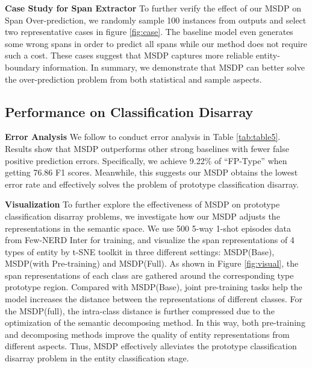 \documentclass[sigconf,natbib=true,anonymous=False]{acmart}
\begin{document}
\textbf{Case Study for Span Extractor} To further verify the effect of our MSDP on Span Over-prediction, we randomly sample 100 instances from outputs and select two representative cases in figure \ref{fig:case}. The baseline model even generates some wrong spans in order to predict all spans while our method does not require such a cost. These cases suggest that MSDP captures more reliable entity-boundary information. In summary, we demonstrate that MSDP can better solve the over-prediction problem from both statistical and sample aspects.























\nocite{Ando2005,augenstein-etal-2016-stance,andrew2007scalable,rasooli-tetrault-2015,goodman-etal-2016-noise,harper-2014-learning}
\subsection{Performance on  Classification Disarray}
\textbf{Error Analysis} We follow \cite{wang2022spanproto} to conduct error analysis in Table \ref{tab:table5}. Results show that MSDP outperforms other strong baselines with fewer false positive prediction errors. Specifically, we achieve 9.22\% of “FP-Type” when getting 76.86 F1 scores. Meanwhile, this suggests our MSDP obtains the lowest error rate and effectively solves the problem of prototype classification disarray.

\textbf{Visualization} To further explore the effectiveness of MSDP on prototype classification disarray problems, we investigate how our MSDP adjusts the representations in the semantic space. We use 500 5-way 1-shot episodes data from Few-NERD Inter for training, and visualize the span representations of 4 types of entity by t-SNE toolkit \cite{van2008visualizing} in three different settings: MSDP(Base), MSDP(with Pre-training) and MSDP(Full). As shown in Figure \ref{fig:visual}, the span representations of each class are gathered around the corresponding type prototype region. Compared with MSDP(Base), joint pre-training tasks help the model increases the distance between the representations of different classes. For the MSDP(full), the intra-class distance is further compressed due to the optimization of the semantic decomposing method. In this way, both pre-training and decomposing methods improve the quality of entity representations from different aspects. Thus, MSDP effectively alleviates the prototype classification disarray problem in the entity classification stage.
\end{document}
